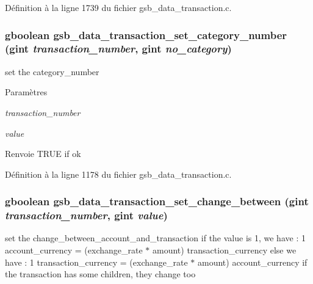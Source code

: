 Définition à la ligne 1739 du fichier gsb\_\-data\_\-transaction.c.

\subsubsection[{gsb\_\-data\_\-transaction\_\-set\_\-category\_\-number}]{\setlength{\rightskip}{0pt plus 5cm}gboolean gsb\_\-data\_\-transaction\_\-set\_\-category\_\-number (gint {\em transaction\_\-number}, \/  gint {\em no\_\-category})}\label{gsb__data__transaction_8h_a31f2706a543b988ba279b1cddb40c53e}
set the category\_\-number 
\begin{DoxyParams}{Paramètres}
\item[{\em transaction\_\-number}]\item[{\em value}]\end{DoxyParams}
\begin{DoxyReturn}{Renvoie}
TRUE if ok 
\end{DoxyReturn}


Définition à la ligne 1178 du fichier gsb\_\-data\_\-transaction.c.

\subsubsection[{gsb\_\-data\_\-transaction\_\-set\_\-change\_\-between}]{\setlength{\rightskip}{0pt plus 5cm}gboolean gsb\_\-data\_\-transaction\_\-set\_\-change\_\-between (gint {\em transaction\_\-number}, \/  gint {\em value})}\label{gsb__data__transaction_8h_a2f40c4afd62edb73a6da1b79951c3fa3}
set the change\_\-between\_\-account\_\-and\_\-transaction if the value is 1, we have : 1 account\_\-currency = (exchange\_\-rate $\ast$ amount) transaction\_\-currency else we have : 1 transaction\_\-currency = (exchange\_\-rate $\ast$ amount) account\_\-currency if the transaction has some children, they change too


